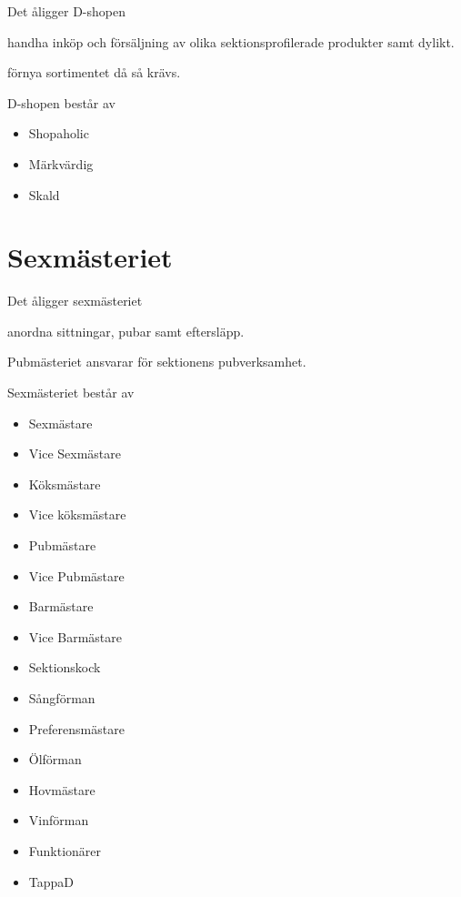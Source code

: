 \documentclass[pdfbookmarks,a4paper,11pt]{article}
\newlength{\itemcollength}
\newenvironment{reglemlista}{%
  \begin{list}{}{%
      \setlength{\labelwidth}{\itemcollength}%
      \setlength{\leftmargin}{\labelwidth + \labelsep}%
      \renewcommand{\makelabel}[1]{%
        \raisebox{0pt}[1ex][0pt]{%
          \makebox[\labelwidth][l]{%
            \parbox[t]{\itemcollength}{%
              \raggedright\hspace{0pt}##1}}}\hfill}%
      }}{%
  \end{list}}
\begin{document}
\begin{reglemlista}
	\item[\textbf{D-shopen}]

	\item[Åligganden]
	Det åligger D-shopen
	\begin{attlista}
		\item handha inköp och försäljning av olika sektionsprofilerade produkter samt dylikt.
		\item förnya sortimentet då så krävs.
	\end{attlista}
	\item[Sammansättning]
	D-shopen består av
	\begin{itemize}
		\item Shopaholic
		\item Märkvärdig
		\item Skald
	\end{itemize}
\end{reglemlista}


\section{Sexmästeriet}

\begin{reglemlista}

	\item[Åligganden]
	Det åligger sexmästeriet
	\begin{attlista}
		\item  anordna sittningar, pubar samt eftersläpp.
	\end{attlista}

	\item[Pubmästeriet]
	Pubmästeriet ansvarar för sektionens pubverksamhet.

	\item[Sammansättning]
	Sexmästeriet består av
	\begin{itemize}
		\item Sexmästare
		\item Vice Sexmästare
		\item Köksmästare
		\item Vice köksmästare
		\item Pubmästare
		\item Vice Pubmästare
		\item Barmästare
		\item Vice Barmästare
		\item Sektionskock
		\item Sångförman
		\item Preferensmästare
		\item Ölförman
		\item Hovmästare
		\item Vinförman
		\item Funktionärer
        \item TappaD
	\end{itemize}
\end{reglemlista}
\end{document}
